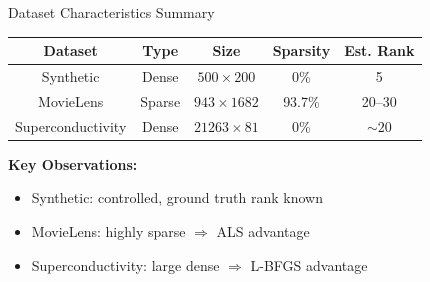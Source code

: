\documentclass[aspectratio=169,usenames,dvipsnames]{beamer}
\begin{document}
\begin{frame}{Dataset Characteristics Summary}

\begin{center}
\renewcommand{\arraystretch}{1.3}
\begin{tabular}{|c|c|c|c|c|}
\hline
\textbf{Dataset} & \textbf{Type} & \textbf{Size} & \textbf{Sparsity} & \textbf{Est. Rank} \\
\hline
Synthetic & Dense & $500 \times 200$ & 0\% & 5 \\
\hline
MovieLens & Sparse & $943 \times 1682$ & 93.7\% & 20--30 \\
\hline
Superconductivity & Dense & $21263 \times 81$ & 0\% & $\sim 20$ \\
\hline
\end{tabular}
\end{center}

\vspace{0.5cm}

\textbf{Key Observations:}
\begin{itemize}
  \item Synthetic: controlled, ground truth rank known
  \item MovieLens: highly sparse $\Rightarrow$ ALS advantage
  \item Superconductivity: large dense $\Rightarrow$ L-BFGS advantage
\end{itemize}

\end{frame}
\end{document}
